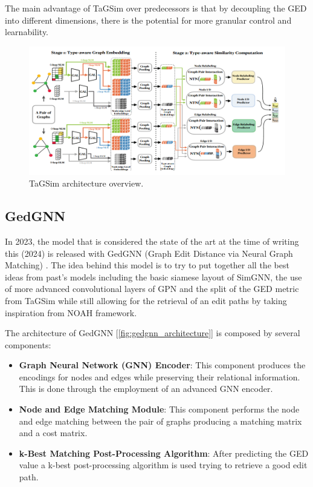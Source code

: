 \documentclass[../Thesis.tex]{subfiles}
\begin{document}
	The main advantage of TaGSim over predecessors is that by decoupling the GED into different dimensions, there is the potential for more granular control and learnability.
	
	\begin{figure}[H]
		\centering
		\includegraphics[width=\textwidth]{Images/tagsim_architecture.png}
		\caption{TaGSim architecture overview.}
		\label{fig:tagsim_architecture}
	\end{figure}

	\subsection{GedGNN}
	
	In 2023, the model that is considered the state of the art at the time of writing this (2024) is released with GedGNN (Graph Edit Distance via Neural Graph Matching) \cite{computing_graph_edit_distance_via_neural_graph_matching}. The idea behind this model is to try to put together all the best ideas from past's models including the basic siamese layout of SimGNN, the use of more advanced convolutional layers of GPN and the split of the GED metric from TaGSim while still allowing for the retrieval of an edit paths by taking inspiration from NOAH framework.
	
	The architecture of GedGNN [\autoref{fig:gedgnn_architecture}] is composed by several components:
	
	\begin{itemize}
		\item \textbf{Graph Neural Network (GNN) Encoder}: This component produces the encodings for nodes and edges while preserving their relational information. This is done through the employment of an advanced GNN encoder.
		\item \textbf{Node and Edge Matching Module}: This component performs the node and edge matching between the pair of graphs producing a matching matrix and a cost matrix.
		\item \textbf{k-Best Matching Post-Processing Algorithm}: After predicting the GED value a k-best post-processing algorithm is used trying to retrieve a good edit path.
	\end{itemize}
	
\end{document}
